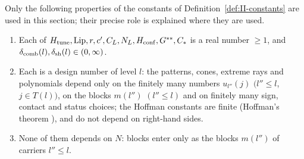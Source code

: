 \documentclass[10pt]{amsart}
\theoremstyle{definition}
\theoremstyle{remark}
\begin{document}
Only the following properties of the constants of
Definition~\ref{def:II-constants} are used in this section; their precise
role is explained where they are used.
\begin{enumerate}
\item[(K1)] Each of $H_{\rm tune},\mathrm{Lip},r,c',C_L,N_L,H_{\rm conf},
G^{**},C_*$ is a real number $\ge1$, and $\delta_{\rm
comb}(l),\delta_{\rm sh}(l)\in(0,\infty)$.
\item[(K2)] Each is a design number of level $l$: the patterns, cones,
extreme rays and polynomials depend only on the finitely many numbers
$u_{l''}(j)$ $(l''\le l$, $j\in T(l))$, on the blocks $m(l'')$
$(l''\le l)$ and on finitely many sign, contact and status choices; the
Hoffman constants are finite (Hoffman's theorem \cite{Hoffman}), and do
not depend on right-hand sides.
\item[(K3)] None of them depends on $N$: blocks enter only as the blocks
$m(l'')$ of carriers $l''\le l$.
\end{enumerate}
\end{document}

